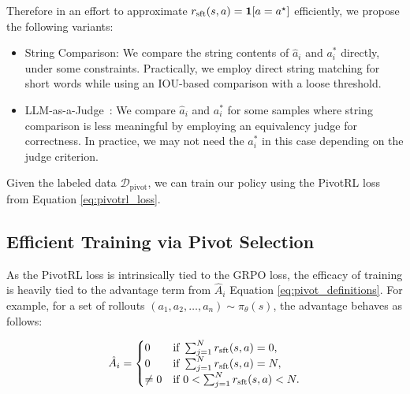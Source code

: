 Therefore in an effort to approximate $r_{\mathrm{sft}}(s, a) = \mathbf{1}[a = a^\star]$ efficiently, we propose the following variants:
\begin{itemize}
    \item String Comparison: We compare the string contents of $\hat{a}_i$ and $a_i^*$ directly, under some constraints. Practically, we employ direct string matching for short words while using an IOU-based comparison with a loose threshold.
    \item LLM-as-a-Judge~\citep{zheng2023judging, lee2023rlaif,tan2025judgebench}: We compare $\hat{a}_i$ and $a_i^*$ for some samples where string comparison is less meaningful by employing an equivalency judge for correctness. In practice, we may not need the $a_i^*$ in this case depending on the judge criterion.
\end{itemize}

Given the labeled data $\mathcal{D}_{\text{pivot}}$, we can train our policy using the PivotRL loss from Equation \ref{eq:pivotrl_loss}.


\subsection{Efficient Training via Pivot Selection}
As the PivotRL loss is intrinsically tied to the GRPO loss, the efficacy of training is heavily tied to the advantage term from $\hat{A}_i$ Equation \ref{eq:pivot_definitions}. For example, for a set of rollouts $(a_1, a_2, \dots, a_n) \sim \pi_{\theta}(s)$, the advantage behaves as follows:

\begin{equation}
    \hat{A}_i = 
    \begin{cases} 
      0 & \text{if } \sum_{j=1}^{N} r_{\mathrm{sft}} (s,a) = 0, \\
      0 & \text{if } \sum_{j=1}^{N} r_{\mathrm{sft}} (s,a) = N, \\
      \neq 0 & \text{if } 0 < \sum_{j=1}^{N} r_{\mathrm{sft}} (s,a) < N.
    \end{cases}
\end{equation}

